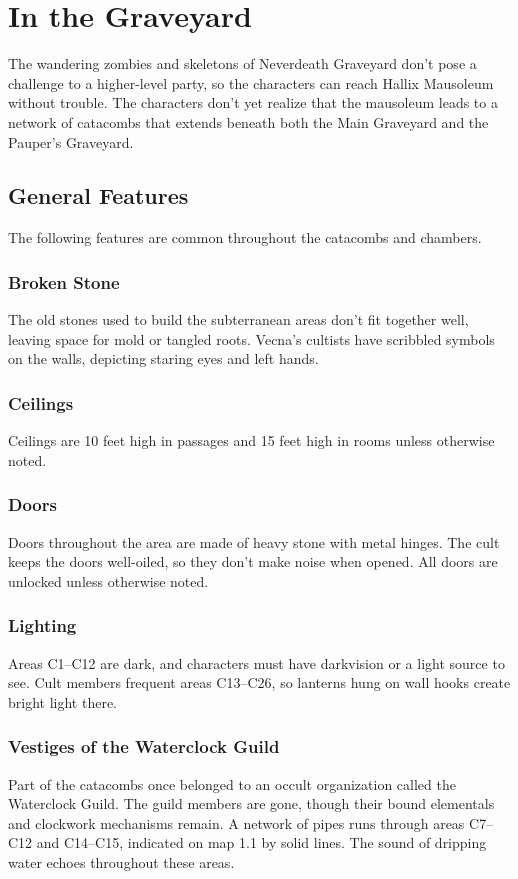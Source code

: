 \documentclass[10pt,a4paper,twoside,bg=print,twocolumn,openany,nodeprecatedcode]{dndbook}
\begin{document}
\section{In the Graveyard}
The wandering zombies and skeletons of Neverdeath Graveyard don't pose a challenge to a higher-level party, so the characters can reach Hallix Mausoleum without trouble. The characters don't yet realize that the mausoleum leads to a network of catacombs that extends beneath both the Main Graveyard and the Pauper's Graveyard.

\subsection{General Features}
The following features are common throughout the catacombs and chambers.

\subsubsection{Broken Stone}
The old stones used to build the subterranean areas don't fit together well, leaving space for mold or tangled roots. Vecna's cultists have scribbled symbols on the walls, depicting staring eyes and left hands.

\subsubsection{Ceilings}
Ceilings are 10 feet high in passages and 15 feet high in rooms unless otherwise noted.

\subsubsection{Doors}
Doors throughout the area are made of heavy stone with metal hinges. The cult keeps the doors well-oiled, so they don't make noise when opened. All doors are unlocked unless otherwise noted.

\subsubsection{Lighting}
Areas C1–C12 are dark, and characters must have darkvision or a light source to see. Cult members frequent areas C13–C26, so lanterns hung on wall hooks create bright light there.

\subsubsection{Vestiges of the Waterclock Guild}
Part of the catacombs once belonged to an occult organization called the Waterclock Guild. The guild members are gone, though their bound elementals and clockwork mechanisms remain. A network of pipes runs through areas C7–C12 and C14–C15, indicated on map 1.1 by solid lines. The sound of dripping water echoes throughout these areas.
\end{document}
